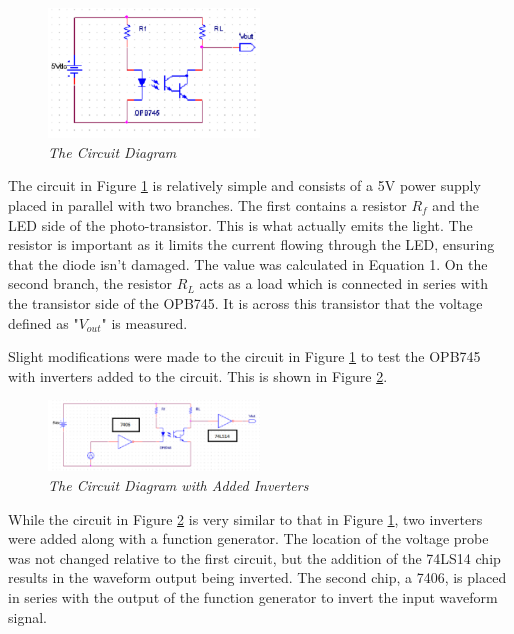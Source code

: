 \documentclass[conference]{IEEEtran}
\begin{document}
\begin{figure}[H]
    \centering
    \includegraphics[width=0.5\textwidth]{Images/Part 1 Circuit.png} %
    \caption{\textit{The Circuit Diagram}}
    \label{fig:circuit_1}
\end{figure}

The circuit in Figure \ref{fig:circuit_1} is relatively simple and consists of a 5V power supply placed in parallel with two branches. The first contains a resistor $R_f$ and the LED side of the photo-transistor. This is what actually emits the light. The resistor is important as it limits the current flowing through the LED, ensuring that the diode isn't damaged. The value was calculated in Equation 1. On the second branch, the resistor $R_L$ acts as a load which is connected in series with the transistor side of the OPB745. It is across this transistor that the voltage defined as "$V_{out}$" is measured.

Slight modifications were made to the circuit in Figure \ref{fig:circuit_1} to test the OPB745 with inverters added to the circuit. This is shown in Figure \ref{fig:circuit_2}.

\begin{figure}[H]
    \centering
    \includegraphics[width=0.5\textwidth]{Images/Part 2 Circuit.png} %
    \caption{\textit{The Circuit Diagram with Added Inverters}}
    \label{fig:circuit_2}
\end{figure}

While the circuit in Figure \ref{fig:circuit_2} is very similar to that in Figure \ref{fig:circuit_1}, two inverters were added along with a function generator. The location of the voltage probe was not changed relative to the first circuit, but the addition of the 74LS14 chip results in the waveform output being inverted. The second chip, a 7406, is placed in series with the output of the function generator to invert the input waveform signal.
\end{document}
